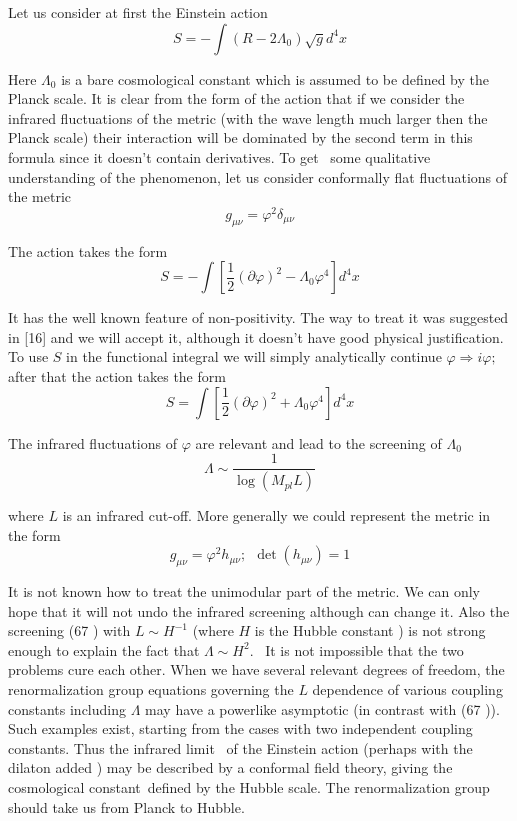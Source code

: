 \documentclass[a4paper,12pt]{article}
\begin{document}
Let us consider at first the Einstein action 
\begin{equation}
S=-\int \left( R-2\Lambda _{0}\right) \sqrt{g}d^{4}x
\end{equation}

Here $\Lambda _{0}$ is a bare cosmological constant which is assumed to be
defined by the Planck scale. It is clear from the form of the action that if
we consider the infrared fluctuations of the metric (with the wave length
much larger then the Planck scale) their interaction will be dominated by
the second term in this formula since it doesn't contain derivatives. To get
\ some qualitative understanding of the phenomenon, let us consider
conformally flat fluctuations of the metric 
\begin{equation}
g_{\mu \nu }=\varphi ^{2}\delta _{\mu \nu }
\end{equation}

The action takes the form 
\begin{equation}
S=-\int [\frac{1}{2}\left( \partial \varphi \right) ^{2}-\Lambda _{0}\varphi
^{4}]d^{4}x
\end{equation}

It has the well known feature of non-positivity. The way to treat it was
suggested in [16] and we will accept it, although it doesn't have good
physical justification. To use $S$ in the functional integral we will simply
analytically continue $\varphi \Rightarrow i\varphi ;$ after that the action
takes the form 
\begin{equation}
S=\int [\frac{1}{2}\left( \partial \varphi \right) ^{2}+\Lambda _{0}\varphi
^{4}]d^{4}x
\end{equation}

The infrared fluctuations of $\varphi $ are relevant and lead to the
screening of $\Lambda _{0}$%
\begin{equation}
\Lambda \sim \frac{1}{\log (M_{pl}L)}
\end{equation}

where $L$ is an infrared cut-off. More generally we could represent the
metric in the form 
\begin{equation}
g_{\mu \nu }=\varphi ^{2}h_{\mu \nu };\ \ \det (h_{\mu \nu })=1
\end{equation}

It is not known how to treat the unimodular part of the metric. We can only
hope that it will not undo the infrared screening although can change it.
Also the screening (67 ) with $L\sim H^{-1}$ (where $H$ is the Hubble
constant ) is not strong enough to explain the fact that $\Lambda \sim H^{2}.
$ \ It is not impossible that the two problems cure each other. When we have
several relevant degrees of freedom, the renormalization group equations
governing the $L$ dependence of various coupling constants including $%
\Lambda $ may have a powerlike asymptotic (in contrast with (67 )). Such
examples exist, starting from the cases with two independent coupling
constants. Thus the infrared limit \ of the Einstein action (perhaps with
the dilaton added ) may be described by a conformal field theory, giving the
cosmological constant\ defined by the Hubble scale. The renormalization
group should take us from Planck to Hubble.
\end{document}
